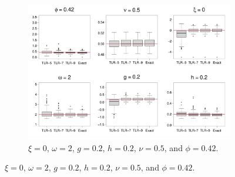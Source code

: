 \documentclass[conference]{IEEEtran}
\begin{document}
\begin{figure}[htp!]
\centering
\begin{subfigure}{0.43\textwidth}%
  \centering
  \includegraphics[width=\linewidth]{./figures/boxplot_0.420000_0.200000_0.200000.pdf}
  \caption{ $\xi = 0$, $\omega = 2$, $g = 0.2$, $h = 0.2$, $\nu = 0.5$, and $\phi = 0.42$.}
\end{subfigure}%
\hspace{2mm}


\end{figure}
\end{document}

